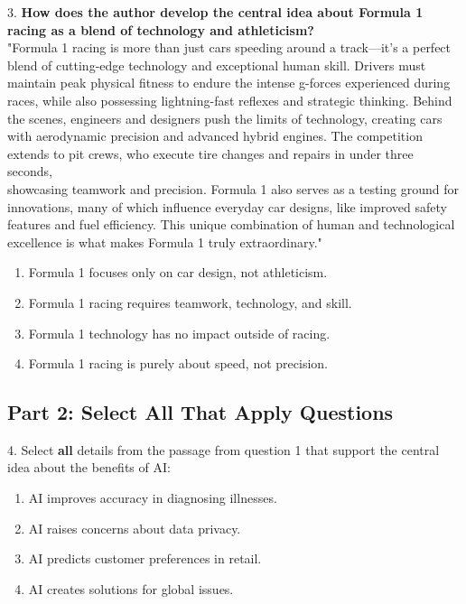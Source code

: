 \documentclass[12pt]{article}
\begin{document}
3. \textbf{How does the author develop the central idea about Formula 1 racing as a blend of technology and athleticism?\\}
"Formula 1 racing is more than just cars speeding around a track—it’s a perfect blend of cutting-edge technology and exceptional human skill. Drivers must \\maintain peak physical fitness to endure the intense g-forces experienced during races, while also possessing lightning-fast reflexes and strategic thinking. Behind the scenes, engineers and designers push the limits of technology, creating cars with aerodynamic precision and advanced hybrid engines. The competition extends to pit crews, who execute tire changes and repairs in under three seconds, \\showcasing teamwork and precision. Formula 1 also serves as a testing ground for innovations, many of which influence everyday car designs, like improved safety features and fuel efficiency. This unique combination of human and technological excellence is what makes Formula 1 truly extraordinary."  
\begin{enumerate}[label=\Alph*.]
    \item Formula 1 focuses only on car design, not athleticism.  
    \item Formula 1 racing requires teamwork, technology, and skill.  
    \item Formula 1 technology has no impact outside of racing.  
    \item Formula 1 racing is purely about speed, not precision.  
\end{enumerate}


\subsection*{Part 2: Select All That Apply Questions}

4. Select \textbf{all} details from the passage from question 1 that support the central \\idea about the benefits of AI:  
\begin{enumerate}[label=\Alph*.]
    \item AI improves accuracy in diagnosing illnesses.  
    \item AI raises concerns about data privacy.  
    \item AI predicts customer preferences in retail.  
    \item AI creates solutions for global issues.  
\end{enumerate}
\end{document}
